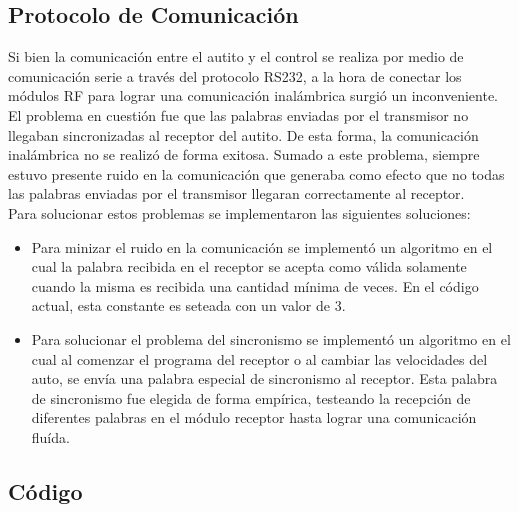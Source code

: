 \documentclass[a4paper,10pt]{article}
\begin{document}
		\subsection{Protocolo de Comunicación}
			Si bien la comunicación entre el autito y el control se realiza por medio de comunicación serie a través del protocolo RS232, a la hora de conectar
			los módulos RF para lograr una comunicación inalámbrica surgió un inconveniente. El problema en cuestión fue que las palabras enviadas por el 
			transmisor no llegaban sincronizadas al receptor del autito. De esta forma, la comunicación inalámbrica no se realizó de forma exitosa. Sumado a este 
			problema, siempre estuvo presente ruido en la comunicación que generaba como efecto que no todas las palabras enviadas por el transmisor llegaran 
			correctamente al receptor.\\
			\indent Para solucionar estos problemas se implementaron las siguientes soluciones:
			\begin{itemize}
				\item Para minizar el ruido en la comunicación se implementó un algoritmo en el cual la palabra recibida en el receptor se acepta como válida
				solamente cuando la misma es recibida una cantidad mínima de veces. En el código actual, esta constante es seteada con un valor de 3.
				\item Para solucionar el problema del sincronismo se implementó un algoritmo en el cual al comenzar el programa del receptor o al cambiar las
				velocidades del auto, se envía una palabra especial de sincronismo al receptor. Esta palabra de sincronismo fue elegida de forma empírica, testeando 
				la recepción de diferentes palabras en el módulo receptor hasta lograr una comunicación fluída.  
			\end{itemize}

		\subsection{Código}
\end{document}
